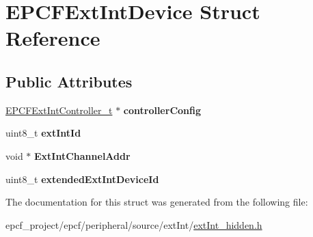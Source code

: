\hypertarget{structEPCFExtIntDevice}{}\section{E\+P\+C\+F\+Ext\+Int\+Device Struct Reference}
\label{structEPCFExtIntDevice}
\subsection*{Public Attributes}
\begin{DoxyCompactItemize}
\item 
\mbox{\label{structEPCFExtIntDevice_a94bc5b79991a7aaaf10d5fa8fa9f24b5}} 
\mbox{\hyperlink{structEPCFExtIntController}{E\+P\+C\+F\+Ext\+Int\+Controller\+\_\+t}} $\ast$ {\bfseries controller\+Config}
\item 
\mbox{\label{structEPCFExtIntDevice_a67debabd177c9a09c39896a9f08a4659}} 
uint8\+\_\+t {\bfseries ext\+Int\+Id}
\item 
\mbox{\label{structEPCFExtIntDevice_a334ec92754a659676bead87bd3a20f0d}} 
void $\ast$ {\bfseries Ext\+Int\+Channel\+Addr}
\item 
\mbox{\label{structEPCFExtIntDevice_ac222482bcb2e0647ab74ab88c4ab9bfc}} 
uint8\+\_\+t {\bfseries extended\+Ext\+Int\+Device\+Id}
\end{DoxyCompactItemize}


The documentation for this struct was generated from the following file\+:\begin{DoxyCompactItemize}
\item 
epcf\+\_\+project/epcf/peripheral/source/ext\+Int/\mbox{\hyperlink{extInt__hidden_8h}{ext\+Int\+\_\+hidden.\+h}}\end{DoxyCompactItemize}
